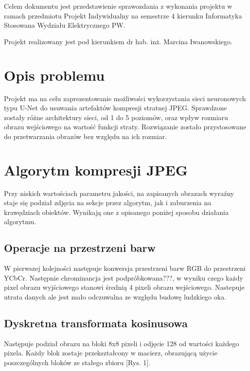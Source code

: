 \documentclass[a4paper,11pt]{article}
\begin{document}
\maketitle
	Celem dokumentu jest przedstawienie sprawozdania z wykonania projektu w ramach przedmiotu Projekt Indywidualny na semestrze 4 kierunku Informatyka Stosowana Wydziału Elektrycznego PW.
\begin{center}
Projekt realizowany jest pod kierunkiem dr hab. inż. Marcina Iwanowskiego.
\end{center}

\newpage

\tableofcontents
\newpage
\section{Opis problemu}
\indent Projekt ma na celu zaprezentowanie możliwości wykorzystania sieci neuronowych typu U-Net do usuwania artefaktów kompresji stratnej JPEG.
Sprawdzone zostały różne architektury sieci, od 1 do 5 poziomów, oraz wpływ rozmiaru obrazu wejściowego na wartość funkcji straty.
Rozwiązanie zostało przystosowane do przetwarzania obrazów bez względu na ich rozmiar.
\section{Algorytm kompresji JPEG}
Przy niskich wartościach parametru jakości, na zapisanych obrazach wyraźny staje się podział zdjęcia na sekcje przez algorytm,
jak i zaburzenia na krawędziach obiektów. Wynikają one z opisanego poniżej sposobu działania algorytmu.
\subsection{Operacje na przestrzeni barw}
W pierwszej kolejności następuje konwersja przestrzeni barw RGB do przestrzeni YCbCr.
Następnie chrominancja jest podpróbkowana???, w wyniku czego każdy pixel obrazu wyjściowego stanowi średnią 4 pixeli obrazu wejściowego.
Nastepuje utrata danych ale jest mało odczuwalna ze względu budowę ludzkiego oka.
\subsection{Dyskretna transformata kosinusowa}
Następuje podział obrazu na bloki 8x8 pixeli i odjęcie 128 od wartości każdego pixela.
Każdy blok zostaje przekształcony w macierz, obrazującą użycie poszczególnych bloków ze stałego zbioru [Rys. 1]. \\
\end{document}

